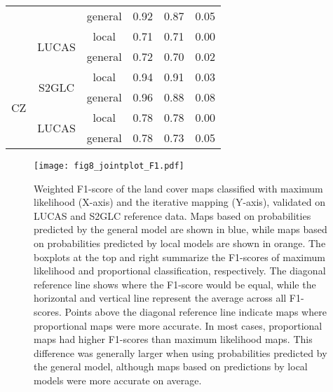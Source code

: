 \begin{table}[H]
\begin{tabular}{c|c|c|p{2.1cm}|p{2.12cm}|p{2cm}}
                        &                        & general & 0.92 & 0.87 & 0.05 \\
                        & \multirow{2}{*}{LUCAS} & local & 0.71 & 0.71 & 0.00 \\
                        &                        & general & 0.72 & 0.70 & 0.02 \\
    \hline
    \multirow{4}{*}{CZ} & \multirow{2}{*}{S2GLC} & local & 0.94 & 0.91 & 0.03 \\
                        &                        & general & 0.96 & 0.88 & 0.08 \\
                        & \multirow{2}{*}{LUCAS} & local & 0.78 & 0.78 & 0.00 \\
                        &                        & general & 0.78 & 0.73 & 0.05 \\
    \end{tabular}
    \end{table}




    \begin{figure}[H]
        \centering
        \texttt{[image: fig8\_jointplot\_F1.pdf]}
        \caption{Weighted F1-score of the land cover maps classified with maximum likelihood (X-axis) and the iterative mapping (Y-axis), validated on LUCAS and S2GLC reference data. Maps based on probabilities predicted by the general model are shown in blue, while maps based on probabilities predicted by local models are shown in orange. The boxplots at the top and right summarize the F1-scores of maximum likelihood and proportional classification, respectively. The diagonal reference line shows where the F1-score would be equal, while the horizontal and vertical line represent the average across all F1-scores. Points above the diagonal reference line indicate maps where proportional maps were more accurate. 
        In most cases, proportional maps had higher F1-scores than maximum likelihood maps. This difference was generally larger when using probabilities predicted by the general model, although maps based on predictions by local models were more accurate on average.}
        \label{fig:f1}
    \end{figure}

